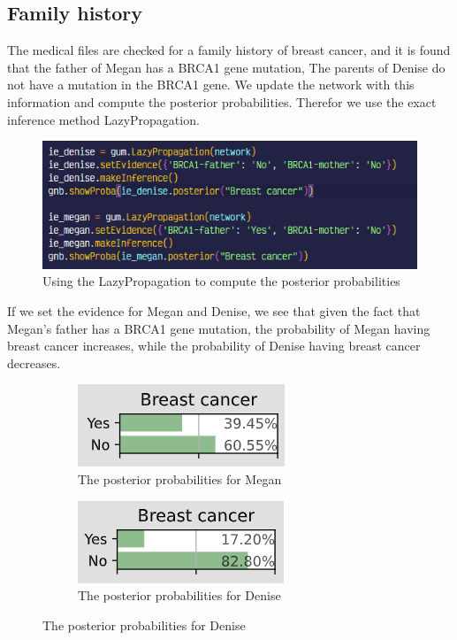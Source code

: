 \documentclass{article}
\begin{document}
\subsection{Family history}
The medical files are checked for a family history of breast cancer, and it is found that the father of Megan has a BRCA1 gene mutation, The parents of Denise do not have a mutation in the BRCA1 gene.
We update the network with this information and compute the posterior probabilities. Therefor we use the exact inference method LazyPropagation.
\begin{figure}[H]
    \centering
    \includegraphics[width=\textwidth]{../figures/inference_BRCA1-parents_code.png}
    \caption{Using the LazyPropagation to compute the posterior probabilities}
    \label{fig:posterior}
\end{figure}

If we set the evidence for Megan and Denise, we see that given the fact that Megan's father has a BRCA1 gene mutation, the probability of Megan having breast cancer increases, while the probability of Denise having breast cancer decreases.


\begin{figure}[H]
    \centering
    \begin{subfigure}{.5\textwidth}
      \centering
      \includegraphics[width=.5\linewidth]{../figures/inference_megan_BRCA1-Father.png}
      \caption{The posterior probabilities for Megan}
      \label{fig:megan_posterior_1}
    \end{subfigure}%
    \begin{subfigure}{.5\textwidth}
      \centering
      \includegraphics[width=.5\linewidth]{../figures/inference_denice_no_mutation_parents.png}
      \caption{The posterior probabilities for Denise}
      \label{fig:sub2}
    \end{subfigure}
    \label{fig:test}
    \end{figure}
\end{document}
